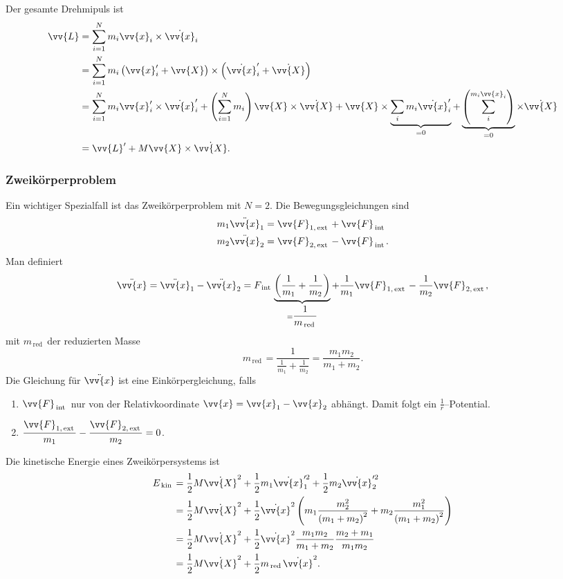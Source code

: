 \documentclass[a4paper,12pt]{article}
\numberwithin{equation}{section}
\begin{document}
Der gesamte Drehmipuls ist
\begin{align*}
        \vv{L}&=\sum_{i=1}^{N}m_i\vv{x}_i\times \dot{\vv{x}}_i\\
              &=\sum_{i=1}^{N}m_i\left(\vv{x}_i'+\vv{X}\right)\times \left(\dot{\vv{x}}_i'+\dot{\vv{X}}\right)\\
              &=\sum_{i=1}^{N}m_i\vv{x}_i'\times \dot{\vv{x}}_i'+\left(\sum_{i=1}^{N}m_i\right)\vv{X}\times \dot{\vv{X}}+\vv{X}\times \underbrace{\sum_{i}^{}m_i\dot{\vv{x}}_i'}_{=0}+\underbrace{\left(\sum_{i}^{m_i\vv{x}_i}\right)}_{=0}\times \dot{\vv{X}}\\
              &=\vv{L}'+M\vv{X}\times \dot{\vv{X}}
.\end{align*}

\subsubsection{Zweikörperproblem}
Ein wichtiger Spezialfall ist das Zweikörperproblem mit $N=2$. Die Bewegungsgleichungen sind
\begin{align*}
        m_1\ddot{\vv{x}}_1&=\vv{F}_{1,\,\text{ext}\,}+\vv{F}_{\,\text{int}\,}\\
        m_2\ddot{\vv{x}}_2&=\vv{F}_{2,\,\text{ext}\,}-\vv{F}_{\,\text{int}\,}
.\end{align*}
Man definiert
\begin{align*}
        \ddot{\vv{x}}=\ddot{\vv{x}}_1-\ddot{\vv{x}}_2=F_{\,\text{int}\,}\underbrace{\left(\dfrac{1}{m_1}+\dfrac{1}{m_2}\right)}_{=\dfrac{1}{m_{\,\text{red}\,} }}+\dfrac{1}{m_1}\vv{F}_{1,\,\text{ext}\,}-\dfrac{1}{m_2}\vv{F}_{2,\,\text{ext}\,}
,\end{align*}
mit $m_{\,\text{red}\,}$ der reduzierten Masse
\[ 
        m_{\,\text{red}\,}=\dfrac{1}{\tfrac{1}{m_1}+\tfrac{1}{m_2}}=\dfrac{m_1m_2}{m_1+m_2}
.\] 
Die Gleichung für $\ddot{\vv{x}}$ ist eine Einkörpergleichung, falls
\begin{enumerate}[label=\arabic*.]
        \item $\vv{F}_{\,\text{int}\,}$ nur von der Relativkoordinate $\vv{x}=\vv{x}_1-\vv{x}_2$ abhängt. Damit folgt ein $\tfrac{1}{r}$--Potential.
        \item $\dfrac{\vv{F}_{1,\,\text{ext}\,}}{m_1}-\dfrac{\vv{F}_{2,\,\text{ext}\,}}{m_2}=0$.
\end{enumerate}
Die kinetische Energie eines Zweikörpersystems ist 
\begin{align*}
        E_{\,\text{kin}\,}&=\dfrac{1}{2}M\dot{\vv{X}}^2+\dfrac{1}{2}m_1\dot{\vv{x}}_1'^2+\dfrac{1}{2}m_2\dot{\vv{x}}_2'^2\\
                          &=\dfrac{1}{2}M\dot{\vv{X}}^2+\dfrac{1}{2}\dot{\vv{x}}^2\left(m_1\dfrac{m_2^2}{\left(m_1+m_2\right)^2}+m_2\dfrac{m_1^2}{\left(m_1+m_2\right)^2}\right)\\
                          &=\dfrac{1}{2}M\dot{\vv{X}}^2+\dfrac{1}{2}\dot{\vv{x}}^2\dfrac{m_1m_2}{m_1+m_2}\dfrac{m_2+m_1}{m_1m_2}\\
                          &=\dfrac{1}{2}M\dot{\vv{X}}^2+\dfrac{1}{2}m_{\,\text{red}\,}\dot{\vv{x}}^2
.\end{align*}
\end{document}
